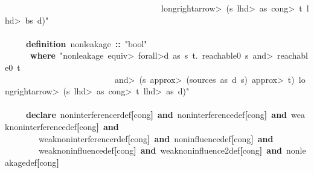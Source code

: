 \documentclass{article}
\newcommand{\syntaxKEYWORDA}[1]{\textcolor[rgb]{0.0,0.4,0.6}{\textbf{#1}}}
\newcommand{\syntaxKEYWORDB}[1]{\textcolor[rgb]{0.0,0.6,0.4}{\textbf{#1}}}
\newcommand{\syntaxLITERALA}[1]{\textcolor[rgb]{1.0,0.0,0.8}{#1}}
\newcommand{\syntaxOPERATOR}[1]{\textcolor[rgb]{0.0,0.0,0.0}{\textbf{#1}}}
\newcommand{\syntaxKEYWORDA}[1]{\textcolor[rgb]{0.0,0.4,0.6}{\textbf{#1}}}
\newcommand{\syntaxKEYWORDB}[1]{\textcolor[rgb]{0.0,0.6,0.4}{\textbf{#1}}}
\newcommand{\syntaxLITERALA}[1]{\textcolor[rgb]{1.0,0.0,0.8}{#1}}
\newcommand{\syntaxOPERATOR}[1]{\textcolor[rgb]{0.0,0.0,0.0}{\textbf{#1}}}
\newcommand{\syntaxKEYWORDA}[1]{\textcolor[rgb]{0.0,0.4,0.6}{\textbf{#1}}}
\newcommand{\syntaxKEYWORDB}[1]{\textcolor[rgb]{0.0,0.6,0.4}{\textbf{#1}}}
\newcommand{\syntaxLITERALA}[1]{\textcolor[rgb]{1.0,0.0,0.8}{#1}}
\newcommand{\syntaxOPERATOR}[1]{\textcolor[rgb]{0.0,0.0,0.0}{\textbf{#1}}}
\newcommand{\syntaxKEYWORDA}[1]{\textcolor[rgb]{0.0,0.4,0.6}{#1}}
\newcommand{\syntaxKEYWORDB}[1]{\textcolor[rgb]{0.0,0.6,0.4}{#1}}
\newcommand{\syntaxLITERALA}[1]{\textcolor[rgb]{1.0,0.0,0.8}{\textbf{#1}}}
\newcommand{\syntaxOPERATOR}[1]{\textcolor[rgb]{0.0,0.0,0.0}{#1}}
\newcommand{\syntaxKEYWORDA}[1]{\textcolor[rgb]{0.0,0.4,0.6}{\textbf{#1}}}
\newcommand{\syntaxKEYWORDB}[1]{\textcolor[rgb]{0.0,0.6,0.4}{\textbf{#1}}}
\newcommand{\syntaxLITERALA}[1]{\textcolor[rgb]{1.0,0.0,0.8}{#1}}
\newcommand{\syntaxOPERATOR}[1]{\textcolor[rgb]{0.0,0.0,0.0}{\textbf{#1}}}
\newcommand{\syntaxKEYWORDA}[1]{\textcolor[rgb]{0.0,0.4,0.6}{\textbf{#1}}}
\newcommand{\syntaxKEYWORDB}[1]{\textcolor[rgb]{0.0,0.6,0.4}{\textbf{#1}}}
\newcommand{\syntaxLITERALA}[1]{\textcolor[rgb]{1.0,0.0,0.8}{#1}}
\newcommand{\syntaxOPERATOR}[1]{\textcolor[rgb]{0.0,0.0,0.0}{\textbf{#1}}}
\begin{document}
\syntaxLITERALA{{\ }{\ }{\ }{\ }{\ }{\ }{\ }{\ }{\ }{\ }{\ }{\ }{\ }{\ }{\ }{\ }{\ }{\ }{\ }{\ }{\ }{\ }{\ }{\ }{\ }{\ }{\ }{\ }{\ }{\ }{\ }{\ }{\ }{\ }{\ }{\ }{\ }\<longrightarrow>{\ }(s{\ }\<lhd>{\ }as{\ }\<cong>{\ }t{\ }\<lhd>{\ }bs{\ }\usebox{\atbox}{\ }d)"}\hspace*{\fill}\\
\hspace*{\fill}\\
{\ }{\ }{\ }{\ }{\ }\syntaxKEYWORDA{definition}{\ }nonleakage{\ }\syntaxOPERATOR{::}{\ }\syntaxLITERALA{"bool"}{\ }\hspace*{\fill}\\
{\ }{\ }{\ }{\ }{\ }{\ }\syntaxKEYWORDB{where}{\ }\syntaxLITERALA{"nonleakage{\ }\<equiv>{\ }\<forall>d{\ }as{\ }s{\ }t.{\ }reachable0{\ }s{\ }\<and>{\ }reachable0{\ }t}\hspace*{\fill}\\
\syntaxLITERALA{{\ }{\ }{\ }{\ }{\ }{\ }{\ }{\ }{\ }{\ }{\ }{\ }{\ }{\ }{\ }{\ }{\ }{\ }{\ }{\ }{\ }{\ }{\ }{\ }{\ }{\ }\<and>{\ }(s{\ }\<approx>{\ }(sources{\ }as{\ }d{\ }s){\ }\<approx>{\ }t){\ }\<longrightarrow>{\ }(s{\ }\<lhd>{\ }as{\ }\<cong>{\ }t{\ }\<lhd>{\ }as{\ }\usebox{\atbox}{\ }d)"}\hspace*{\fill}\\
\hspace*{\fill}\\
{\ }{\ }{\ }{\ }{\ }\syntaxKEYWORDA{declare}{\ }noninterference\usebox{\underscorebox}r\usebox{\underscorebox}def\syntaxOPERATOR{{[}}cong\syntaxOPERATOR{{]}}{\ }\syntaxKEYWORDB{and}{\ }noninterference\usebox{\underscorebox}def\syntaxOPERATOR{{[}}cong\syntaxOPERATOR{{]}}{\ }\syntaxKEYWORDB{and}{\ }weak\usebox{\underscorebox}noninterference\usebox{\underscorebox}def\syntaxOPERATOR{{[}}cong\syntaxOPERATOR{{]}}{\ }\syntaxKEYWORDB{and}\hspace*{\fill}\\
{\ }{\ }{\ }{\ }{\ }{\ }{\ }{\ }weak\usebox{\underscorebox}noninterference\usebox{\underscorebox}r\usebox{\underscorebox}def\syntaxOPERATOR{{[}}cong\syntaxOPERATOR{{]}}{\ }\syntaxKEYWORDB{and}{\ }noninfluence\usebox{\underscorebox}def\syntaxOPERATOR{{[}}cong\syntaxOPERATOR{{]}}{\ }\syntaxKEYWORDB{and}{\ }\hspace*{\fill}\\
{\ }{\ }{\ }{\ }{\ }{\ }{\ }{\ }weak\usebox{\underscorebox}noninfluence\usebox{\underscorebox}def\syntaxOPERATOR{{[}}cong\syntaxOPERATOR{{]}}{\ }\syntaxKEYWORDB{and}{\ }weak\usebox{\underscorebox}noninfluence2\usebox{\underscorebox}def\syntaxOPERATOR{{[}}cong\syntaxOPERATOR{{]}}{\ }\syntaxKEYWORDB{and}{\ }nonleakage\usebox{\underscorebox}def\syntaxOPERATOR{{[}}cong\syntaxOPERATOR{{]}}\hspace*{\fill}\\
\end{document}
